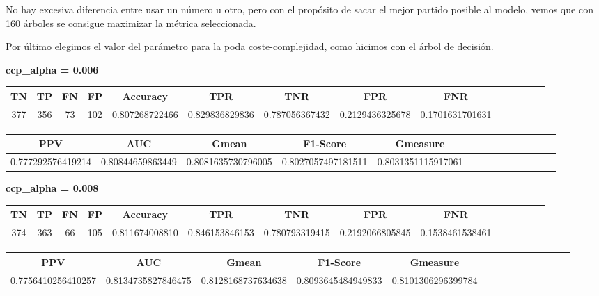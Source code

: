 \documentclass[a4]{article}
\begin{document}
No hay excesiva diferencia entre usar un número u otro, pero con el propósito de sacar el mejor partido posible al modelo, vemos que con 160 árboles se consigue maximizar la métrica seleccionada. 

Por último elegimos el valor del parámetro para la poda coste-complejidad, como hicimos con el árbol de decisión.

\textbf{ccp\_alpha = 0.006}
\begin{center}
\begin{tabular}{|c|c|c|c|c|c|c|c|c|c|c|c|c|c|}
\hline
\multicolumn{1}{|c|}{\textbf{TN}}& \textbf{TP} & \textbf{FN} & \textbf{FP} & \textbf{Accuracy} & \textbf{TPR} & \textbf{TNR} & \textbf{FPR} &\textbf{FNR} \\ \hline
  377 & 356 & 73 & 102 & 0.807268722466 & 0.829836829836 & 0.787056367432 & 0.2129436325678 & 0.1701631701631 \\ \hline
\end{tabular}
\end{center}

\begin{center}
\begin{tabular}{|c|c|c|c|c|c|c|c|c|c|c|c|c|c|}
\hline
\multicolumn{1}{|c|}{\textbf{PPV}} & \textbf{AUC} & \textbf{Gmean} & \textbf{F1-Score} & \textbf{Gmeasure}  \\ \hline
  0.777292576419214 & 0.80844659863449 & 0.8081635730796005 & 0.8027057497181511 & 0.8031351115917061 \\ \hline
\end{tabular}
\end{center}

\textbf{ccp\_alpha = 0.008}
\begin{center}
\begin{tabular}{|c|c|c|c|c|c|c|c|c|c|c|c|c|c|}
\hline
\multicolumn{1}{|c|}{\textbf{TN}}& \textbf{TP} & \textbf{FN} & \textbf{FP} & \textbf{Accuracy} & \textbf{TPR} & \textbf{TNR} & \textbf{FPR} &\textbf{FNR} \\ \hline
  374 & 363 & 66 & 105 & 0.811674008810 & 0.846153846153 & 0.780793319415 & 0.2192066805845 & 0.1538461538461 \\ \hline
\end{tabular}
\end{center}

\begin{center}
\begin{tabular}{|c|c|c|c|c|c|c|c|c|c|c|c|c|c|}
\hline
\multicolumn{1}{|c|}{\textbf{PPV}} & \textbf{AUC} & \textbf{Gmean} & \textbf{F1-Score} & \textbf{Gmeasure}  \\ \hline
  0.7756410256410257 & 0.8134735827846475 & 0.8128168737634638 & 0.8093645484949833 & 0.8101306296399784
 \\ \hline
\end{tabular}
\end{center}
\end{document}
